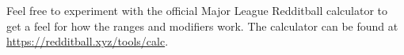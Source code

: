 
Feel free to experiment with the official Major League Redditball calculator
to get a feel for how the ranges and modifiers work.
The calculator can be found at \url{https://redditball.xyz/tools/calc}.



\pagebreak

\pagebreak

